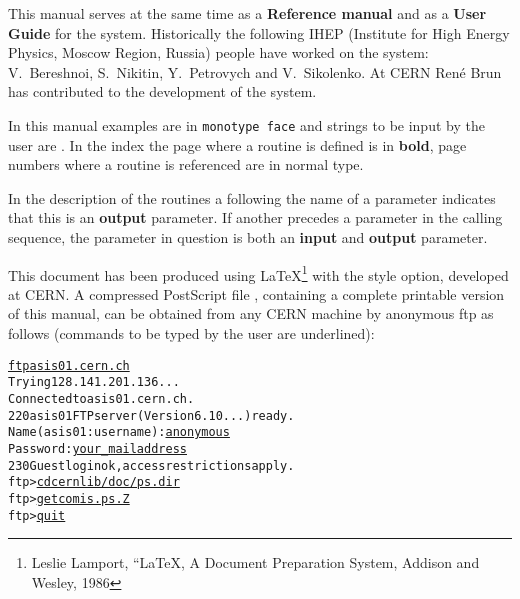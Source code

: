 
This manual serves at the same time as a {\bf Reference manual}
and as a {\bf User Guide} for the \COMIS{} system.
Historically the following IHEP (Institute for High Energy Physics, Moscow Region,
Russia) people have worked on the \COMIS{} system:
V.~Bereshnoi, S.~Nikitin, Y.~Petrovych and V.~Sikolenko.
At CERN Ren\'e Brun has contributed to the development of the system.

In this manual examples are in {\tt monotype face} and strings to be
input by the user are .  In the index the page where
a routine is defined is in {\bf bold}, page numbers where a routine is
referenced are in normal type.

In the description of the routines a \Lit{*} following the name of a
parameter indicates that this is an {\bf output} parameter.  If
another \Lit{*} precedes a parameter in the calling sequence, the
parameter in question is both an {\bf input} and {\bf output}
parameter.

This document has been produced using \LaTeX\footnote{Leslie Lamport,
``\LaTeX, {A Document Preparation System}, Addison and Wesley, 1986}%
with the  style option, developed at CERN. 
A compressed PostScript file , 
containing a complete printable version
of this manual, can be obtained from any CERN machine
by anonymous ftp as follows
(commands to be typed by the user are underlined):

\vspace*{3mm} 
\begin{alltt}
    \underline{ftp asis01.cern.ch}
    Trying 128.141.201.136...
    Connected to asis01.cern.ch.
    220 asis01 FTP server (Version 6.10 ...) ready.
    Name (asis01:username): \underline{anonymous}
    Password: \underline{your\_{}mailaddress}
    230 Guest login ok, access restrictions apply.
    ftp> \underline{cd cernlib/doc/ps.dir}
    ftp> \underline{get comis.ps.Z}
    ftp> \underline{quit}
\end{alltt}

\newpage
\tableofcontents

